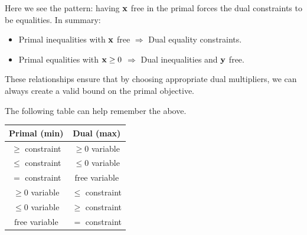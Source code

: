 Here we see the pattern: having $\mathbf{x}$ free in the primal forces the dual constraints to be equalities. In summary:
\begin{itemize}
\item Primal inequalities with $\mathbf{x}$ free $\Rightarrow$ Dual equality constraints.
\item Primal equalities with $\mathbf{x} \geq 0$ $\Rightarrow$ Dual inequalities and $\mathbf{y}$ free.
\end{itemize}

These relationships ensure that by choosing appropriate dual multipliers, we can always create a valid bound on the primal objective.


The following table can help remember the above.\\

\begin{center}
\begin{tabular}{cc}
\toprule
\textbf{Primal (min)}       & \textbf{Dual (max)}      \\ 
\midrule
\(\geq\) constraint         & \(\geq 0\) variable      \\ 
\(\leq\) constraint         & \(\leq 0\) variable      \\ 
\(=\) constraint            & \(\text{free}\) variable \\ 
\(\geq 0\) variable         & \(\leq\) constraint      \\ 
\(\leq 0\) variable         & \(\geq\) constraint      \\ 
\(\text{free}\) variable    & \(=\) constraint         \\ 
\bottomrule
\end{tabular}
\end{center}

